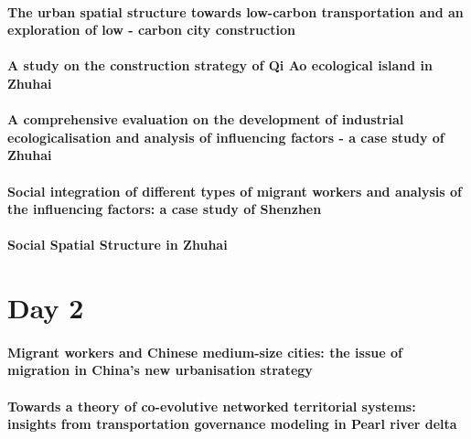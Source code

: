 \paragraph{The urban spatial structure towards low-carbon transportation and an exploration of low - carbon city construction}




\paragraph{A study on the construction strategy of Qi Ao ecological island in Zhuhai}





\paragraph{A comprehensive evaluation on the development of industrial ecologicalisation and analysis of influencing factors - a case study of Zhuhai}





\paragraph{Social integration of different types of migrant workers and analysis of the influencing factors: a case study of Shenzhen}




\paragraph{Social Spatial Structure in Zhuhai}






\section*{Day 2}



\paragraph{Migrant workers and Chinese medium-size cities: the issue of migration in China’s new urbanisation strategy}




\paragraph{Towards a theory of co-evolutive networked territorial systems: insights from transportation governance modeling in Pearl river delta}





